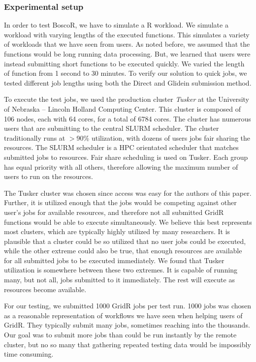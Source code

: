 \subsubsection{Experimental setup}  

In order to test BoscoR, we have to simulate a R workload.  We simulate a workload with varying lengths of the executed functions.  This simulates a variety of workloads that we have seen from users.  As noted before, we assumed that the functions would be long running data processing.  But, we learned that users were instead submitting short functions to be executed quickly.  We varied the length of function from 1 second to 30 minutes.  To verify our solution to quick jobs, we tested different job lengths using both the Direct and Glidein submission method.

To execute the test jobs, we used the production cluster \textit{Tusker} at the University of Nebraska -- Lincoln Holland Computing Center.  This cluster is composed of 106 nodes, each with 64 cores, for a total of 6784 cores.  The cluster has numerous users that are submitting to the central SLURM \cite{yoo2003slurm} scheduler.  The cluster traditionally runs at $>$90\% utilization, with dozens of users jobs fair sharing the resources.  The SLURM scheduler is a HPC orientated scheduler that matches submitted jobs to resources.  Fair share scheduling is used on Tusker.  Each group has equal priority with all others, therefore allowing the maximum number of users to run on the resources.

The Tusker cluster was chosen since access was easy for the authors of this paper.  Further, it is utilized enough that the jobs would be competing against other user's jobs for available resources, and therefore not all submitted GridR functions would be able to execute simultaneously.  We believe this best represents most clusters, which are typically highly utilized by many researchers.  It is plausible that a cluster could be so utilized that no user jobs could be executed, while the other extreme could also be true, that enough resources are available for all submitted jobs to be executed immediately.  We found that Tusker utilization is somewhere between these two extremes.  It is capable of running many, but not all, jobs submitted to it immediately.  The rest will execute as resources become available.

For our testing, we submitted 1000 GridR jobs per test run. 1000 jobs was chosen as a reasonable representation of workflows we have seen when helping users of GridR.  They typically submit many jobs, sometimes reaching into the thousands.  Our goal was to submit more jobs than could be run instantly by the remote cluster, but no so many that gathering repeated testing data would be impossibly time consuming.

